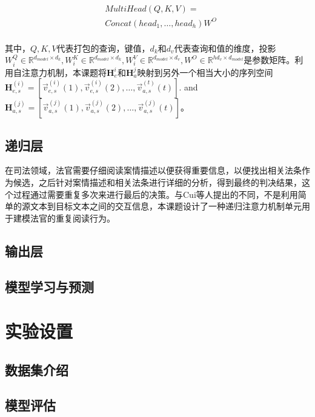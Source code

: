 \begin{equation}\label{eq:multi_head_attention}
    \begin{aligned}
        &MultiHead(Q,K,V) = \\
        &Concat(head_1,\dots,head_h)W^{O} \\            
    \end{aligned}
\end{equation}

其中，$Q,K,V$代表打包的查询，键值，$d_k$和$d_v$代表查询和值的维度，投影$W_i^Q \in \mathbb{R}^{d_{model} \times d_k}, W_i^K 
\in \mathbb{R}^{d_{model} \times d_k},W_i^V \in \mathbb{R}^{d_{model} \times d_v}, W^O \in \mathbb{R}^{hd_v \times d_{model}}$是参数矩阵。利用自注意力机制，本课题将$\textbf{H}_e^i$和$\textbf{H}_a^j$映射到另外一个相当大小的序列空间 $\textbf{H}_{e,s}^{(i)} = [\vec{v}_{e,s}^{(i)}(1), \vec{v}_{e,s}^{(i)}(2), \dots, \vec{v}_{a,s}^{(t)}(t)]$. and $\textbf{H}_{a,s}^{(j)}=[\vec{v}_{a,s}^{(j)}(1), \vec{v}_{a,s}^{(j)}(2), \dots, \vec{v}_{a,s}^{(j)}(t)]$。
\subsection{递归层}
在司法领域，法官需要仔细阅读案情描述以便获得重要信息，以便找出相关法条作为候选，之后针对案情描述和相关法条进行详细的分析，得到最终的判决结果，这个过程通过需要重复多次来进行最后的决策。与Cui等人\cite{CuiCWWLH17}提出的不同，不是利用简单的源文本到目标文本之间的交互信息，本课题设计了一种递归注意力机制单元用于建模法官的重复阅读行为。
\subsection{输出层}

\subsection{模型学习与预测}


\section{实验设置}
\label{sec:ran_exper}
\subsection{数据集介绍}

\subsection{模型评估}

